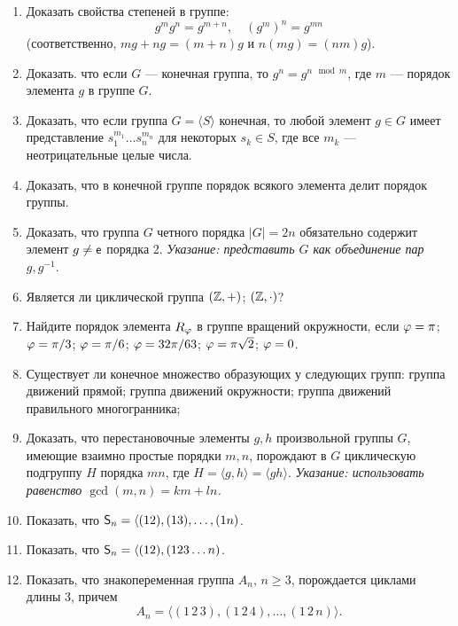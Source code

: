 \begin{enumerate}
\item Доказать свойства степеней в группе:
$$
g^mg^n=g^{m+n},\quad (g^m)^n = g^{mn}
$$
(соответственно, $mg+ng=(m+n)g$ и $n(mg)=(nm)g$).

\item Доказать. что если $G$ --- конечная группа, то $g^n = g^{n\mod m}$, где $m$ --- порядок элемента $g$ в группе $G$.

\item Доказать, что если группа $G=\langle S\rangle$ конечная, то любой элемент $g\in G$ имеет представление $s_1^{m_1}\dots s_n^{m_n}$ для некоторых $s_k\in S$, где все $m_k$ --- неотрицательные целые числа.

\item Доказать, что в конечной группе порядок всякого элемента делит порядок группы.

\item Доказать, что группа $G$ четного порядка $|G|=2n$ обязательно содержит элемент $g\ne\mathsf e$ порядка 2. \textsl{Указание: представить $G$ как объединение пар $g,g^{-1}$}.

\item Является ли циклической группа \ipunkt $(\mathbb Z,+)$; \ipunkt $(\mathbb Z,\cdot)$?

\item Найдите порядок элемента $R_\varphi$ в группе вращений окружности, если \ipunkt $\varphi=\pi$; \ipunkt $\varphi=\pi/3$; \ipunkt $\varphi=\pi/6$; \ipunkt $\varphi=32\pi/63$; \ipunkt $\varphi=\pi\sqrt 2$; \ipunkt $\varphi=0$.

\item Существует ли конечное множество образующих у следующих групп: \ipunkt группа движений прямой; \ipunkt группа движений окружности; \ipunkt группа движений правильного многогранника;

\item Доказать, что перестановочные элементы $g,h$ произвольной группы $G$, имеющие взаимно простые порядки $m,n$, порождают в $G$ циклическую подгруппу $H$ порядка $mn$, где $H=\langle g,h\rangle=\langle gh\rangle$. \textsl{Указание: использовать равенство $\gcd(m,n)=km+ln$.}

\item Показать, что ${\mathsf{S}}_n = \langle (12),(13),\dots,(1n)$.
\item Показать, что ${\mathsf{S}}_n = \langle (12),(123\dots n)$.
\item Показать, что знакопеременная группа $A_n$, $n\ge 3$, порождается циклами длины 3, причем
$$
A_n = \langle (1\,2\,3), (1\,2\,4), \dots, (1\,2\,n) \rangle.
$$


\end{enumerate}
